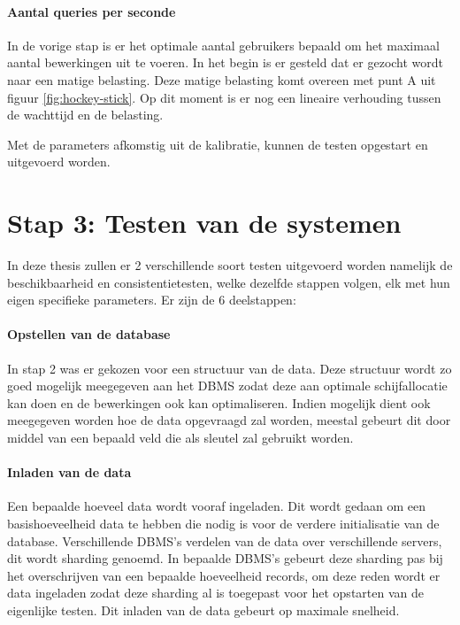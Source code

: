\paragraph{Aantal queries per seconde} In de vorige stap is er het optimale aantal gebruikers bepaald om het maximaal aantal bewerkingen uit te voeren. In het begin is er gesteld dat er gezocht wordt naar een matige belasting. Deze matige belasting komt overeen met punt A uit figuur \ref{fig:hockey-stick}. Op dit moment is er nog een lineaire verhouding tussen de wachttijd en de belasting. 

Met de parameters afkomstig uit de kalibratie, kunnen de testen opgestart en uitgevoerd worden. 

\section{Stap 3: Testen van de systemen} \label{sec:testenvandesystemen}
In deze thesis zullen er 2 verschillende soort testen uitgevoerd worden namelijk de beschikbaarheid en consistentietesten, welke dezelfde stappen volgen, elk met hun eigen specifieke parameters. Er zijn de 6 deelstappen: 

\paragraph{Opstellen van de database} In stap 2 was er gekozen voor een structuur van de data. Deze structuur wordt zo goed mogelijk meegegeven aan het DBMS zodat deze aan optimale schijfallocatie kan doen en de bewerkingen ook kan optimaliseren. Indien mogelijk dient ook meegegeven worden hoe de data opgevraagd zal worden, meestal gebeurt dit door middel van een bepaald veld die als sleutel zal gebruikt worden. 

\paragraph{Inladen van de data} Een bepaalde hoeveel data wordt vooraf ingeladen. Dit wordt gedaan om een basishoeveelheid data te hebben die nodig is voor de verdere initialisatie van de database. Verschillende DBMS's verdelen van de data over verschillende servers, dit wordt sharding genoemd. In bepaalde DBMS's gebeurt deze sharding pas bij het overschrijven van een bepaalde hoeveelheid records, om deze reden wordt er data ingeladen zodat deze sharding al is toegepast voor het opstarten van de eigenlijke testen. Dit inladen van de data gebeurt op maximale snelheid. 

